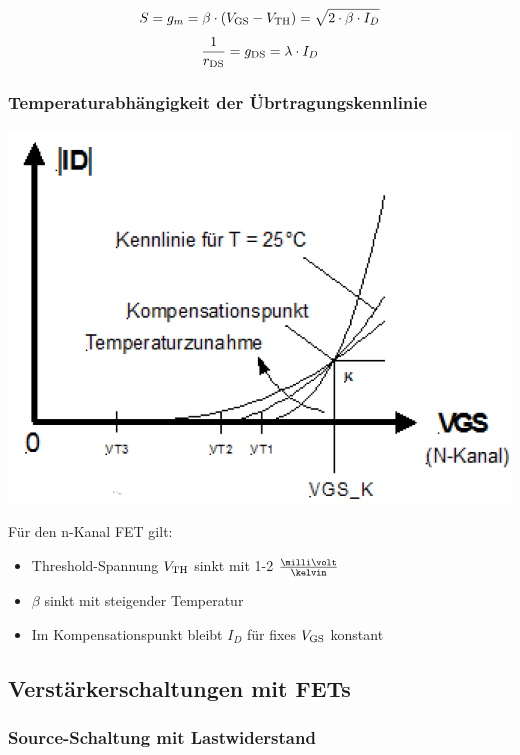 $$ S = g_m = \beta \cdot (V_{\rm GS} - V_{\rm TH}) = \sqrt{2 \cdot \beta \cdot I_D}$$ %
$$ \frac{1}{r_{\rm DS}} = g_{\rm DS} = \lambda \cdot I_D $$


\subsubsection{Temperaturabhängigkeit der Übrtragungskennlinie}

\begin{minipage}[c]{0.4\columnwidth}
    \includegraphics[width= \columnwidth]{images/mos_fet_eingangskennlinie_temperatur.png}
\end{minipage}
\hfill
\begin{minipage}[c]{0.58\columnwidth}
    Für den n-Kanal FET gilt:
    \begin{itemize}
        \item Threshold-Spannung $V_{\rm TH}$ sinkt mit 1-2 $\frac{\milli \volt}{\kelvin}$
        \item $\beta$ sinkt mit steigender Temperatur
        \item Im Kompensationspunkt bleibt $I_D$ für fixes $V_{\rm GS}$ konstant
    \end{itemize}
\end{minipage}

    
\subsection{Verstärkerschaltungen mit FETs}

\subsubsection{Source-Schaltung mit Lastwiderstand}

